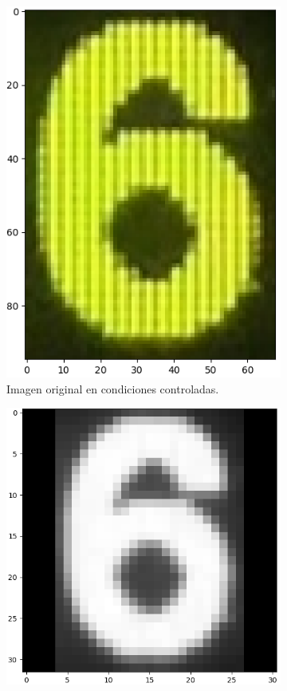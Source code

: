 \begin{figure}[hp!]
    \caption{Comparación del procesamiento de imágenes tomadas en condiciones controladas y no controladas.}
    \label{fig:good_bad_conditions}
    \centering
    \begin{subfigure}[t]{0.3\textwidth}
        \centering
        \includegraphics[height=\x1cm]{3_Reconocimiento/Figs/test_sample6_good_original}
        \caption{Imagen original en condiciones controladas.}
        \label{fig:good_conditions_original}
    \end{subfigure}
    \hfill
    \begin{subfigure}[t]{0.3\textwidth}
        \centering
        \includegraphics[height=\x1cm]{3_Reconocimiento/Figs/test_sample6_good_padded}

\end{subfigure}
\end{figure}
